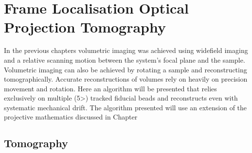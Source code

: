 \ifpdf
    \graphicspath{{Chapters/flopt/Figs/Raster/}{Chapters/flopt/Figs/PDF/}{Chapters/flopt/Figs/}}
\else
    \graphicspath{{Chapters/flopt/Figs/Vector/}{Chapters/flopt/Figs/}}
\fi

\chapter{Frame Localisation Optical Projection Tomography}\label{chapter:flopt}

In the previous chapters volumetric imaging was achieved using widefield imaging and a relative scanning motion between the system's focal plane and the sample.
Volumetric imaging can also be achieved by rotating a sample and reconstructing tomographically.
Accurate reconstructions of volumes rely on heavily on precision movement and rotation.
Here an algorithm will be presented that relies exclusively on multiple (5>) tracked fiducial beads and reconstructs even with systematic mechanical drift.
The algorithm presented will use an extension of the projective mathematics discussed in Chapter %


\section{Tomography}


